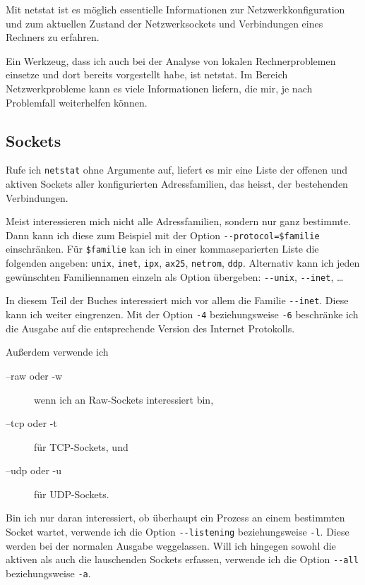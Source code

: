 \begin{abstractsec}
  Mit netstat ist es möglich essentielle Informationen zur
  Netzwerkkonfiguration und zum aktuellen Zustand der Netzwerksockets und
  Verbindungen eines Rechners zu erfahren.
\end{abstractsec}
\begin{normaltext}
  Ein Werkzeug, dass ich auch bei der Analyse von lokalen Rechnerproblemen
  einsetze und dort bereits vorgestellt habe, ist netstat. Im Bereich
  Netzwerkprobleme kann es viele Informationen liefern, die mir, je nach
  Problemfall weiterhelfen können.

  \subsection{Sockets}
  \label{sec:netz-werkzeuge-netstat-sockets}

  Rufe ich \verb?netstat? ohne Argumente auf, liefert es mir eine Liste der
  offenen und aktiven Sockets aller konfigurierten Adressfamilien, das
  heisst, der bestehenden Verbindungen.

  Meist interessieren mich nicht alle Adressfamilien, sondern nur ganz
  bestimmte. Dann kann ich diese zum Beispiel mit der Option
  \verb?--protocol=$familie? einschränken. Für \verb?$familie? kan ich in
  einer kommaseparierten Liste die folgenden angeben: \verb?unix?,
  \verb?inet?, \verb?ipx?, \verb?ax25?, \verb?netrom?, \verb?ddp?. Alternativ
  kann ich jeden gewünschten Familiennamen einzeln als Option übergeben:
  \verb?--unix?, \verb?--inet?, \ldots

  In diesem Teil der Buches interessiert mich vor allem die Familie
  \verb?--inet?. Diese kann ich weiter eingrenzen. Mit der Option \verb?-4?
  beziehungsweise \verb?-6? beschränke ich die Ausgabe auf die entsprechende
  Version des Internet Protokolls.

  Außerdem verwende ich
  \begin{description}
    \item[--raw oder -w] wenn ich an Raw-Sockets interessiert bin,
    \item[--tcp oder -t] für TCP-Sockets, und
    \item[--udp oder -u] für UDP-Sockets.
  \end{description}

  Bin ich nur daran interessiert, ob überhaupt ein Prozess an einem bestimmten
  Socket wartet, verwende ich die Option \verb?--listening? beziehungsweise
  \verb?-l?. Diese werden bei der normalen Ausgabe weggelassen. Will ich
  hingegen sowohl die aktiven als auch die lauschenden Sockets erfassen,
  verwende ich die Option \verb?--all? beziehungsweise \verb?-a?.


\end{normaltext}
